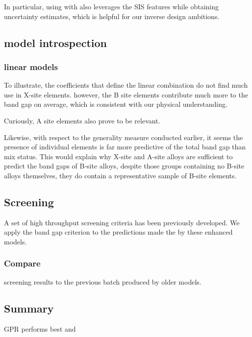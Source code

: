 \documentclass[aip, jmp, amsmath, amssymb]{revtex4-2}
\begin{document}
In particular, using  with  also leverages the SIS features
while obtaining uncertainty estimates, which is helpful for our
inverse design ambitions.
\subsection*{model introspection}
\label{sec:orgb1a0927}
\subsubsection*{linear models}
\label{sec:orge37fcda}
To illustrate, the coefficients that define the linear combination do
not find much use in X-site elements. however, the B site elements
contribute much more to the band gap on average, which is consistent
with our physical understanding.

Curiously, A site elements also prove to be relevant.

Likewise, with respect to the generality measure conducted earlier, it
seems the presence of individual elements is far more predictive of
the total band gap than mix status. This would explain why X-site and
A-site alloys are sufficient to predict the band gaps of B-site alloys,
despite those groups containing no B-site alloys themselves, they do
contain a representative sample of B-site elements.
\subsubsection*{}
\label{sec:org3d6e5bc}
\subsection*{Screening}
\label{sec:org057dbfb}
A set of high throughput screening criteria has been previously
developed\cite{mannodi-kanakkithodi-2022-data-driven}. We apply the
band gap criterion to the predictions made the by these enhanced models.

\subsubsection*{Compare}
\label{sec:orgd3651ec}
screening results to the previous batch produced by older models.

\subsection*{Summary}
\label{sec:org8c53431}
GPR performs best and
\end{document}
